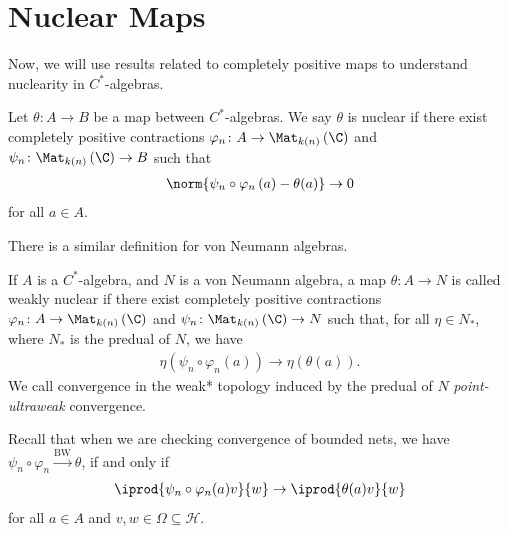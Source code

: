 \documentclass[10pt]{mypackage}
\begin{document}
\section{Nuclear Maps}%
Now, we will use results related to completely positive maps to understand nuclearity in $C^{\ast}$-algebras.
\begin{definition}
  Let $\theta\colon A\rightarrow B$ be a map between $C^{\ast}$-algebras. We say $\theta$ is nuclear if there exist completely positive contractions $\varphi_n\colon A\rightarrow \Mat_{k(n)}\left( \C \right)$ and $\psi_n\colon \Mat_{k(n)}\left( \C \right)\rightarrow B$ such that
  \begin{align*}
    \norm{\psi_n\circ \varphi_n\left( a \right) - \theta(a)}\rightarrow 0
  \end{align*}
  for all $a\in A$.
\end{definition}
There is a similar definition for von Neumann algebras.
\begin{definition}
  If $A$ is a $C^{\ast}$-algebra, and $N$ is a von Neumann algebra, a map $\theta\colon A\rightarrow N$ is called weakly nuclear if there exist completely positive contractions $\varphi_n\colon A\rightarrow \Mat_{k(n)}\left( \C \right)$ and $\psi_n\colon \Mat_{k(n)} \left( \C \right)\rightarrow N$ such that, for all $\eta\in N_{\ast}$, where $N_{\ast}$ is the predual of $N$, we have
  \begin{align*}
    \eta\left( \psi_n\circ \varphi_{n}\left( a \right) \right) \rightarrow \eta\left( \theta\left( a \right) \right).
  \end{align*}
  We call convergence in the weak* topology induced by the predual of $N$ \textit{point-ultraweak} convergence.
\end{definition}
Recall that when we are checking convergence of bounded nets, we have $\psi_n\circ\varphi_n\xrightarrow{\text{BW}} \theta$, if and only if
\begin{align*}
  \iprod{\psi_n\circ\varphi_n(a)v}{w} \rightarrow \iprod{\theta(a)v}{w}
\end{align*}
for all $a\in A$ and $v,w\in \Omega\subseteq \mathcal{H}$.\newline
\end{document}

